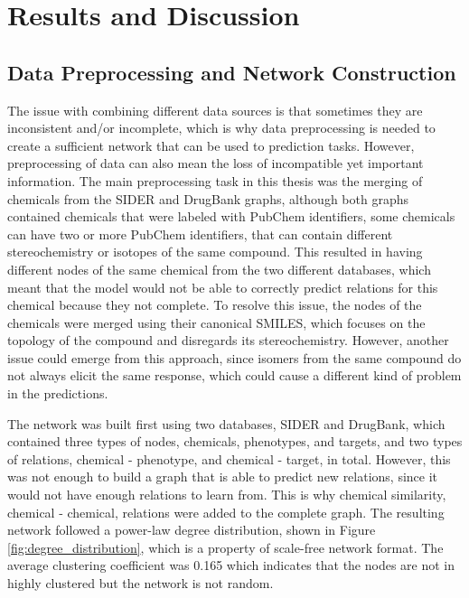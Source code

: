 \chapter{Results and Discussion}
\label{results}

\section{Data Preprocessing and Network Construction}
The issue with combining different data sources is that sometimes they are inconsistent and/or incomplete, which is why data preprocessing is needed to create a sufficient network that can be used to prediction tasks. However, preprocessing of data can also mean the loss of incompatible yet important information. The main preprocessing task in this thesis was the merging of chemicals from the \ac{SIDER} and DrugBank graphs, although both graphs contained chemicals that were labeled with PubChem identifiers, some chemicals can have two or more PubChem identifiers, that can contain different stereochemistry or isotopes of the same compound. This resulted in having different nodes of the same chemical from the two different databases, which meant that the model would not be able to correctly predict relations for this chemical because they not complete. To resolve this issue, the nodes of the chemicals were merged using their canonical \ac{SMILES}, which focuses on the topology of the compound and disregards its stereochemistry. However, another issue could emerge from this approach, since isomers from the same compound do not always elicit the same response, which could cause a different kind of problem in the predictions.

The network was built first using two databases, \ac{SIDER} and DrugBank, which contained three types of nodes, chemicals, phenotypes, and targets, and two types of relations, chemical - phenotype, and chemical - target, in total. However, this was not enough to build a graph that is able to predict new relations, since it would not have enough relations to learn from. This is why chemical similarity, chemical - chemical, relations were added to the complete graph. The resulting network followed a power-law degree distribution, shown in Figure \ref{fig:degree_distribution}, which is a property of scale-free network format. The average clustering coefficient was 0.165 which indicates that the nodes are not in highly clustered but the network is not random.

